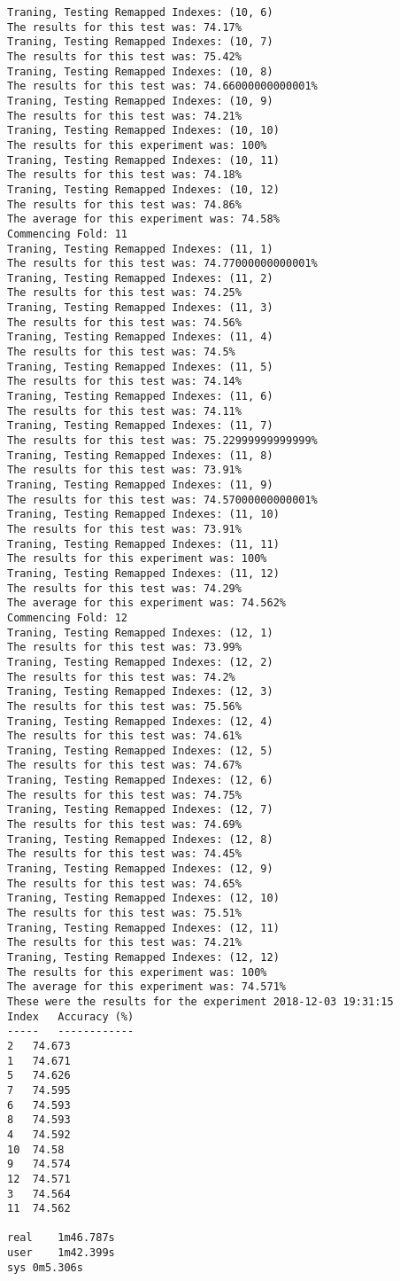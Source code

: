 \begin{lstlisting}[basicstyle=\tiny]
Traning, Testing Remapped Indexes: (10, 6)
The results for this test was: 74.17%
Traning, Testing Remapped Indexes: (10, 7)
The results for this test was: 75.42%
Traning, Testing Remapped Indexes: (10, 8)
The results for this test was: 74.66000000000001%
Traning, Testing Remapped Indexes: (10, 9)
The results for this test was: 74.21%
Traning, Testing Remapped Indexes: (10, 10)
The results for this experiment was: 100%
Traning, Testing Remapped Indexes: (10, 11)
The results for this test was: 74.18%
Traning, Testing Remapped Indexes: (10, 12)
The results for this test was: 74.86%
The average for this experiment was: 74.58%
Commencing Fold: 11
Traning, Testing Remapped Indexes: (11, 1)
The results for this test was: 74.77000000000001%
Traning, Testing Remapped Indexes: (11, 2)
The results for this test was: 74.25%
Traning, Testing Remapped Indexes: (11, 3)
The results for this test was: 74.56%
Traning, Testing Remapped Indexes: (11, 4)
The results for this test was: 74.5%
Traning, Testing Remapped Indexes: (11, 5)
The results for this test was: 74.14%
Traning, Testing Remapped Indexes: (11, 6)
The results for this test was: 74.11%
Traning, Testing Remapped Indexes: (11, 7)
The results for this test was: 75.22999999999999%
Traning, Testing Remapped Indexes: (11, 8)
The results for this test was: 73.91%
Traning, Testing Remapped Indexes: (11, 9)
The results for this test was: 74.57000000000001%
Traning, Testing Remapped Indexes: (11, 10)
The results for this test was: 73.91%
Traning, Testing Remapped Indexes: (11, 11)
The results for this experiment was: 100%
Traning, Testing Remapped Indexes: (11, 12)
The results for this test was: 74.29%
The average for this experiment was: 74.562%
Commencing Fold: 12
Traning, Testing Remapped Indexes: (12, 1)
The results for this test was: 73.99%
Traning, Testing Remapped Indexes: (12, 2)
The results for this test was: 74.2%
Traning, Testing Remapped Indexes: (12, 3)
The results for this test was: 75.56%
Traning, Testing Remapped Indexes: (12, 4)
The results for this test was: 74.61%
Traning, Testing Remapped Indexes: (12, 5)
The results for this test was: 74.67%
Traning, Testing Remapped Indexes: (12, 6)
The results for this test was: 74.75%
Traning, Testing Remapped Indexes: (12, 7)
The results for this test was: 74.69%
Traning, Testing Remapped Indexes: (12, 8)
The results for this test was: 74.45%
Traning, Testing Remapped Indexes: (12, 9)
The results for this test was: 74.65%
Traning, Testing Remapped Indexes: (12, 10)
The results for this test was: 75.51%
Traning, Testing Remapped Indexes: (12, 11)
The results for this test was: 74.21%
Traning, Testing Remapped Indexes: (12, 12)
The results for this experiment was: 100%
The average for this experiment was: 74.571%
These were the results for the experiment 2018-12-03 19:31:15
Index	Accuracy (%)
-----	------------
2	74.673
1	74.671
5	74.626
7	74.595
6	74.593
8	74.593
4	74.592
10	74.58
9	74.574
12	74.571
3	74.564
11	74.562

real	1m46.787s
user	1m42.399s
sys	0m5.306s

\end{lstlisting}
